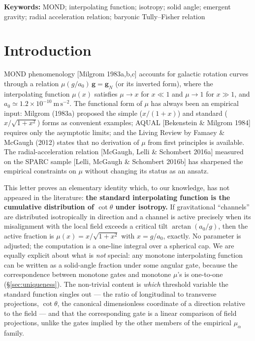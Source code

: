 \documentclass[11pt]{article}
\theoremstyle{plain}
\begin{document}
\medskip
\noindent\textbf{Keywords:} MOND; interpolating function; isotropy; solid angle; emergent gravity; radial acceleration relation; baryonic Tully--Fisher relation

\section{Introduction}\label{sec:intro}

MOND phenomenology [Milgrom 1983a,b,c] accounts for galactic rotation curves through a relation $\mu(g/a_0)\,\mathbf{g} = \mathbf{g}_N$ (or its inverted form), where the interpolating function $\mu(x)$ satisfies $\mu\to x$ for $x\ll 1$ and $\mu\to 1$ for $x\gg 1$, and $a_0 \simeq 1.2\times10^{-10}\ \mathrm{m\,s^{-2}}$. The functional form of $\mu$ has always been an empirical input: Milgrom (1983a) proposed the simple ($x/(1+x)$) and standard ($x/\sqrt{1+x^2}$) forms as convenient examples; AQUAL [Bekenstein \& Milgrom 1984] requires only the asymptotic limits; and the Living Review by Famaey \& McGaugh (2012) states that no derivation of $\mu$ from first principles is available. The radial-acceleration relation [McGaugh, Lelli \& Schombert 2016a] measured on the SPARC sample [Lelli, McGaugh \& Schombert 2016b] has sharpened the empirical constraints on $\mu$ without changing its status as an ansatz.

This letter proves an elementary identity which, to our knowledge, has not appeared in the literature: \textbf{the standard interpolating function is the cumulative distribution of $\cot\theta$ under isotropy.} If gravitational ``channels'' are distributed isotropically in direction and a channel is active precisely when its misalignment with the local field exceeds a critical tilt $\arctan(a_0/g)$, then the active fraction is $\mu(x)=x/\sqrt{1+x^2}$ with $x=g/a_0$, exactly. No parameter is adjusted; the computation is a one-line integral over a spherical cap. We are equally explicit about what is \emph{not} special: any monotone interpolating function can be written as a solid-angle fraction under some angular gate, because the correspondence between monotone gates and monotone $\mu$'s is one-to-one (\S\ref{sec:uniqueness}). The non-trivial content is \emph{which} threshold variable the standard function singles out --- the ratio of longitudinal to transverse projections, $\cot\theta$, the canonical dimensionless coordinate of a direction relative to the field --- and that the corresponding gate is a linear comparison of field projections, unlike the gates implied by the other members of the empirical $\mu_\alpha$ family.
\end{document}
